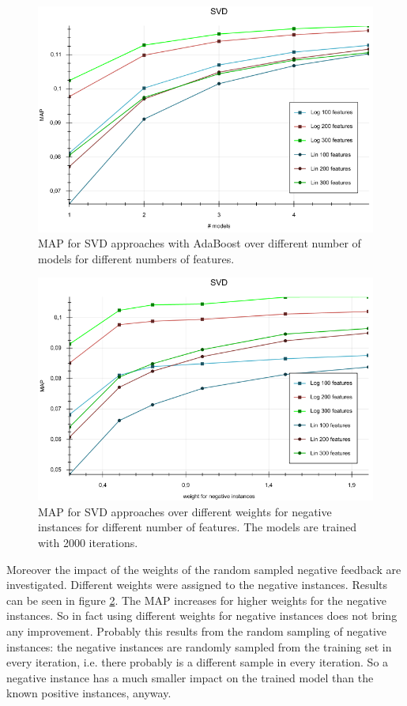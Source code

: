 \documentclass[10pt]{reportMaster}
\begin{document}
\begin{figure}
	\centering
	\includegraphics[width=1\textwidth]{figures/experiments/SVDModels}
	\caption{MAP for SVD approaches with AdaBoost over different number of models for different numbers of features.}
	\label{fig:SVDModels}
\end{figure}


\begin{figure}
	\centering
	\includegraphics[width=1\textwidth]{figures/experiments/SVDWeights}
	\caption{MAP for SVD approaches over different weights for negative instances for different number of features. The models are trained with 2000 iterations.}
	\label{fig:SVDWeights}
\end{figure}

Moreover the impact of the weights of the random sampled negative feedback are investigated.
Different weights were assigned to the negative instances.
Results can be seen in figure \ref{fig:SVDWeights}.
The MAP increases for higher weights for the negative instances.
So in fact using different weights for negative instances does not bring any improvement.
Probably this results from the random sampling of negative instances: the negative instances are randomly sampled from the training set in every iteration, i.e. there probably is a different sample in every iteration.
So a negative instance has a much smaller impact on the trained model than the known positive instances, anyway.
\end{document}
